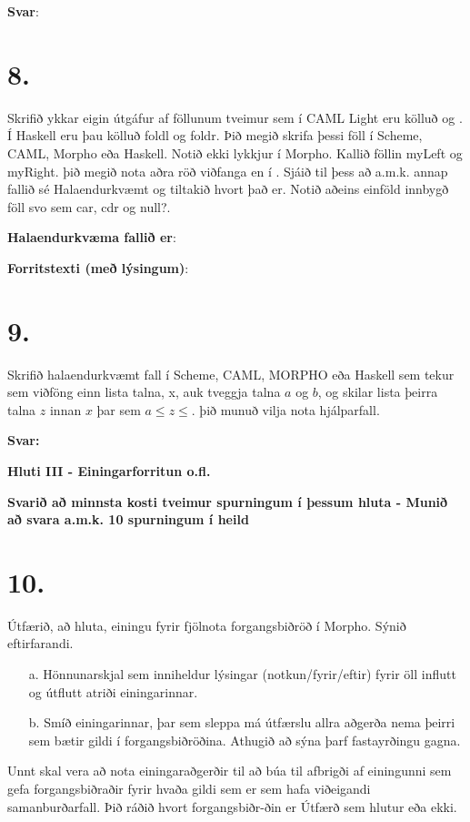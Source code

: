 \documentclass{article}
\newcommand{\sv}{\textbf{Svar:}}
\newcommand{\bo}[1]{\textbf{#1}}
\begin{document}
     \textbf{Svar}:


     \newpage
     \section{8.}
     Skrifið ykkar eigin útgáfur af föllunum tveimur sem í CAML Light 
     eru kölluð  og . Í Haskell eru þau kölluð foldl og foldr. 
     Þið megið skrifa þessi föll í Scheme, CAML, Morpho eða Haskell. Notið
     ekki lykkjur í Morpho. Kallið föllin myLeft og myRight. þið megið nota aðra röð viðfanga en í . Sjáið til þess að a.m.k.
     annap fallið sé Halaendurkvæmt og tiltakið hvort það er. Notið 
     aðeins einföld innbygð föll svo sem car, cdr og null?.


     \textbf{Halaendurkvæma fallið er}:


     \textbf{Forritstexti (með lýsingum)}:


     \newpage
     \section{9.}
     Skrifið halaendurkvæmt fall í Scheme, CAML, MORPHO eða Haskell
     sem tekur sem viðföng einn lista talna, x, auk tveggja talna $a$ og $b$,
     og skilar lista þeirra talna $z$ innan $x$ þar sem $a \leq z \leq$. þið munuð 
     vilja nota hjálparfall.


     \sv 




     \newpage

     \begin{center}
     \bo{Hluti III - Einingarforritun o.fl.}

     \bo{Svarið að minnsta kosti tveimur spurningum í þessum hluta - Munið að svara a.m.k. 10 spurningum í heild}
     \end{center}


     \section{10.}
     Útfærið, að hluta, einingu fyrir fjölnota forgangsbiðröð í Morpho.
     Sýnið eftirfarandi.
     \begin{itemize}
        \item[a.] Hönnunarskjal sem inniheldur lýsingar (notkun/fyrir/eftir) fyrir
                  öll influtt og útflutt atriði einingarinnar.
        \item[b.] Smíð einingarinnar, þar sem sleppa má útfærslu allra 
                  aðgerða nema þeirri sem bætir gildi í forgangsbiðröðina.
                  Athugið að sýna þarf fastayrðingu gagna.
                  
     \end{itemize}
     Unnt skal vera að nota einingaraðgerðir til að búa til afbrigði af 
     einingunni sem gefa forgangsbiðraðir fyrir hvaða gildi sem er sem
     hafa viðeigandi samanburðarfall. Þið ráðið hvort forgangsbiðr-ðin er
     Útfærð sem hlutur eða ekki.
\end{document}
